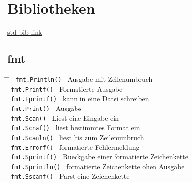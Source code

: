 \documentclass[twoside,a4paper,12pt]{article}
\begin{document}
\section{Bibliotheken}
\href{https://pkg.go.dev/std}{std bib link}
\label{link:pkg}

\subsection{fmt}
\begin{tabbing}
 \hspace{2mm} \= \hspace{50mm} \= \kill
 \> \verb| fmt.Println() | \> Ausgabe mit Zeilenumbruch \\ 
 \> \verb| fmt.Printf() | \> Formatierte Ausgabe \\
 \> \verb| fmt.Fprintf() | \> kann in eine Datei schreiben \\ 
 \> \verb| fmt.Print() | \> Ausgabe \\ 
 \> \verb| fmt.Scan() | \> Liest eine Eingabe ein \\ 
 \> \verb| fmt.Scnaf() | \> liest bestimmtes Format ein \\ 
 \> \verb| fmt.Scanln() | \> liest bis zum Zeilenumbruch \\ 
 \> \verb| fmt.Errorf() | \> formatierte Fehlermeldung \\ 
 \> \verb| fmt.Sprintf() | \> Rueckgabe einer formatierte Zeichenkette \\ 
 \> \verb| fmt.Sprintln() | \> formatierte Zeichenkette ohen Ausgabe \\ 
 \> \verb| fmt.Sscanf() | \> Parst eine Zeichenkette \\ 
\end{tabbing}
\end{document}
